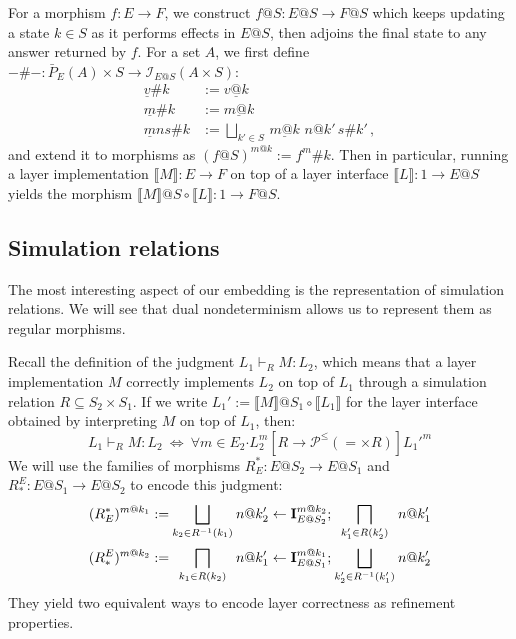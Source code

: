 \documentclass[draft,11pt]{report}
\newcommand{\bdot}{\boldsymbol{\cdot}}
\begin{document}
For a morphism $f : E \rightarrow F$,
we construct $f@S : E@S \rightarrow F@S$
which keeps updating a state $k \in S$
as it performs effects in $E@S$,
then adjoins the final state to any answer
returned by $f$.
For a set $A$, we first define
$-\#- : \bar{P}_E(A) \times S \rightarrow \mathcal{I}_{E@S}(A \times S)$:
\begin{align*}
  \underline{v}\#k &:= \underline{v@k} \\
  \underline{m}\#k &:= \underline{m@k} \\
  \underline{m}ns\#k &:=
    \bigsqcup_{k' \in S} \, \underline{m@k} \,\, n@k' \, s\#k' \,,
\end{align*}
and extend it to morphisms as $(f@S)^{m@k} := f^m\#k$.
Then in particular,
running a layer implementation
$\llbracket M \rrbracket : E \rightarrow F$
on top of a layer interface
$\llbracket L \rrbracket : 1 \rightarrow E@S$
yields the morphism
$\llbracket M \rrbracket @ S \circ \llbracket L \rrbracket :
 1 \rightarrow F@S$.


\subsection{Simulation relations} %

The most interesting aspect of our embedding
is the representation of simulation relations.
We will see that dual nondeterminism
allows us to represent them as regular morphisms.

Recall the definition of
the judgment $L_1 \vdash_R M : L_2$,
which means that a layer implementation $M$
correctly implements $L_2$ on top of $L_1$
through a simulation relation $R \subseteq S_2 \times S_1$.
If we write
$L_1' := \llbracket M \rrbracket @ S_1 \circ \llbracket L_1 \rrbracket$
for the layer interface obtained
by interpreting $M$ on top of $L_1$,
then:
\[
  L_1 \vdash_R M : L_2 \:\Leftrightarrow\:
  \forall m \in E_2 \bdot
    L_2^m
    \mathrel{[R \rightarrow \mathcal{P}^\le({=} \times R)]}
    {L_1'}^m
\]
We will use the families of morphisms
$R^*_E : E@S_2 \rightarrow E@S_1$ and
$R_*^E : E@S_1 \rightarrow E@S_2$
to encode this judgment:
\[
  {\everymath={\displaystyle}
  \begin{array}{r@{\:}c@{\:}c@{\:}c@{\:}l}
  (R^*_E)^{m@k_1} := &
    \bigsqcup_{k_2 \in R^{-1}(k_1)} &
    n@k_2' \leftarrow \mathbf{I}^{m@k_2}_{E@S_2} ; &
    \bigsqcap_{k_1' \in R(k_2')} &
    n@k_1' \\[4ex]
  (R_*^E)^{m@k_2} := &
    \bigsqcap_{k_1 \in R(k_2)} &
    n@k_1' \leftarrow \mathbf{I}^{m@k_1}_{E@S_1} ; &
    \bigsqcup_{k_2' \in R^{-1}(k_1')} &
    n@k_2'
  \end{array}}
\]
They yield two equivalent ways to encode
layer correctness as refinement properties.
\end{document}
